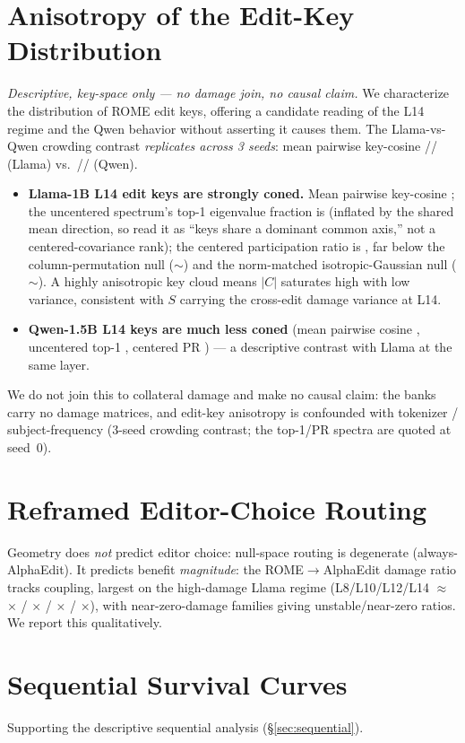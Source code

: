 \section{Anisotropy of the Edit-Key Distribution}
\label{app:aniso}
\emph{Descriptive, key-space only --- no damage join, no causal claim.} We
characterize the distribution of ROME edit keys, offering a candidate reading
of the L14 regime and the Qwen behavior without asserting it causes them. The
Llama-vs-Qwen crowding contrast \emph{replicates across 3 seeds}: mean pairwise
key-cosine \aniLlamaMeanCos{}/\aniLlamaMeanCosB{}/\aniLlamaMeanCosC{} (Llama)
vs.\ \aniQwenMeanCos{}/\aniQwenMeanCosB{}/\aniQwenMeanCosC{} (Qwen).

\begin{itemize}
\item \textbf{Llama-1B L14 edit keys are strongly coned.} Mean pairwise
  key-cosine \aniLlamaMeanCos{}; the uncentered spectrum's top-1 eigenvalue
  fraction is \aniLlamaTopOne{} (inflated by the shared mean direction, so read
  it as ``keys share a dominant common axis,'' not a centered-covariance rank);
  the centered participation ratio is \aniLlamaPR{}, far below the
  column-permutation null ($\sim$\aniPermNull{}) and the norm-matched
  isotropic-Gaussian null ($\sim$\aniGaussNull{}). A highly anisotropic key
  cloud means $|C|$ saturates high with low variance, consistent with $S$
  carrying the cross-edit damage variance at L14.
\item \textbf{Qwen-1.5B L14 keys are much less coned} (mean pairwise cosine
  \aniQwenMeanCos{}, uncentered top-1 \aniQwenTopOne{}, centered PR
  \aniQwenPR{}) --- a descriptive contrast with Llama at the same layer.
\end{itemize}
We do not join this to collateral damage and make no causal claim: the banks
carry no damage matrices, and edit-key anisotropy is confounded with
tokenizer / subject-frequency (3-seed crowding contrast; the top-1/PR spectra
are quoted at seed~0).

\section{Reframed Editor-Choice Routing}
\label{app:d3}
Geometry does \emph{not} predict editor choice: null-space routing is
degenerate (always-AlphaEdit). It predicts benefit \emph{magnitude}: the
ROME$\rightarrow$AlphaEdit damage ratio tracks coupling, largest on the
high-damage Llama regime (L8/L10/L12/L14 $\approx$ \dThreeRatioLeight{}$\times$
/ \dThreeRatioLten{}$\times$ / \dThreeRatioLtwelve{}$\times$ /
\dThreeRatioLfourteen{}$\times$), with near-zero-damage families giving
unstable/near-zero ratios. We report this qualitatively.

\section{Sequential Survival Curves}
\label{app:seq}
Supporting the descriptive sequential analysis (\S\ref{sec:sequential}).


